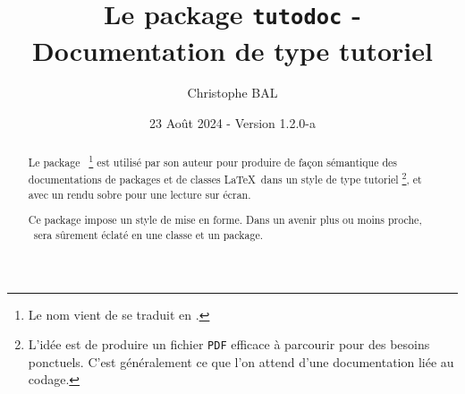 \title{Le package \texttt{tutodoc} - Documentation de type tutoriel}
\author{Christophe BAL}
\date{23 Août 2024 - Version 1.2.0-a}

\maketitle

\begin{abstract}
Le package \thispack\
\footnote{
    Le nom vient de  se traduit en .
}
est utilisé par son auteur pour produire de façon sémantique des documentations de packages et de classes \LaTeX\ dans un style de type tutoriel
\footnote{
    L'idée est de produire un fichier \texttt{PDF} efficace à parcourir pour des besoins ponctuels. C'est généralement ce que l'on attend d'une documentation liée au codage.
},
et avec un rendu sobre pour une lecture sur écran.


\begin{tdocnote}
     Ce package impose un style de mise en forme.
    Dans un avenir plus ou moins proche, \thispack\ sera sûrement éclaté en une classe et un package.
\end{tdocnote}
\end{abstract}

